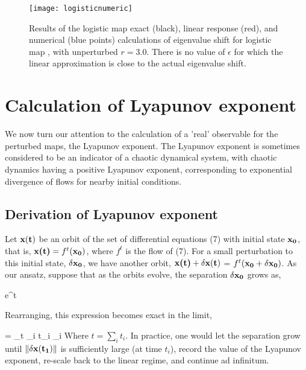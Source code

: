 \documentclass[aps,pre,
                showpacs,
                twocolumn,
                groupedaddress,
                superscriptaddress,
                floatfix]{revtex4-1}
\begin{document}
\begin{figure}[htbp]
\texttt{[image: logisticnumeric]}
    \caption{\label{fig:logisticnumeric}
Results of the logistic map exact (black), linear response (red), and
numerical (blue points) calculations of eigenvalue shift for logistic map
, with unperturbed $r=3.0$. There is no value of
$\epsilon$ for which the linear approximation is close to the actual
eigenvalue shift.
        }
\end{figure}


\section{Calculation of Lyapunov exponent}
\label{sect:LyapExp}

We now turn our attention to the calculation of a 'real' observable for
the perturbed maps, the Lyapunov exponent. The Lyapunov exponent is
sometimes considered to be an indicator of a chaotic dynamical system,
with chaotic dynamics having a positive Lyapunov exponent, corresponding
to exponential divergence of flows for nearby initial conditions.

\subsection{Derivation of Lyapunov exponent}

Let $\bf x(t)$ be an orbit of the set of differential equations (7) with
initial state $\bf x_{0}$, that is, $\textbf{x(t)} = f^{t}(\textbf{$\bf
x_0$})$, where $f^t$ is the flow of (7). For a small perturbation to this
initial state, $\bf \delta x_{0}$, we have another orbit, $\textbf{x(t)}
+ \textbf{$\bf \delta x(t)$}$ = $f^{t}(\textbf{$\bf x_{0}$} +
\textbf{$\bf \delta x_{0}$})$. As our ansatz, suppose that as the orbits
evolve, the separation $\bf \delta x_{0}$ grows as,

\beq
e^{\lambda t} \approx \left\Vert {} \right\Vert
\eeq

Rearranging, this expression becomes exact in the limit,

\beq
\lambda = \lim_{t\rightarrow \infty}  \sum_{i} t_{i} \lambda_{i}
\eeq
Where $t = \sum_{i} t_{i}$. In practice, one would let the separation
grow until $\Vert \bf \delta x(t_{1}) \Vert$ is sufficiently large (at
time $t_{i}$), record the value of the Lyapunov exponent, re-scale back
to the linear regime, and continue ad infinitum.
\end{document}
